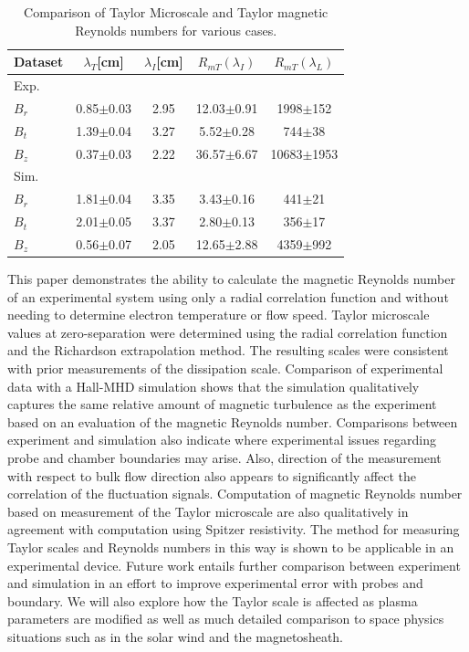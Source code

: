 \documentclass[aps,prl,amsmath,amssymb,reprint,superscriptaddress]{revtex4-1} %
\begin{document}
\begin{table} [htbp]
\caption{\label{tab:Rms1}Comparison of Taylor Microscale and Taylor magnetic Reynolds numbers for various cases.}
\begin{tabular}{lcccc}
\toprule
Dataset								& $\lambda_{T}$[cm]	&$\lambda_{I}$[cm]	&$R_{mT}(\lambda_{I})$&$R_{mT}(\lambda_L)$\\
\hline		  					
Exp.\\
\hline
$B_{r}$ 							& 0.85$\pm$0.03 		&	2.95							& 12.03$\pm$0.91 			& 1998$\pm$152\\
$B_{t}$			 					& 1.39$\pm$0.04 		&	3.27							& 5.52$\pm$0.28 			& 744$\pm$38\\
$B_{z}$ 							& 0.37$\pm$0.03 		&	2.22							& 36.57$\pm$6.67			& 10683$\pm$1953\\
\hline
Sim.\\
\hline
$B_{r}$			 					& 1.81$\pm$0.04 		&	3.35							& 3.43$\pm$0.16 			& 441$\pm$21\\
$B_{t}$ 							& 2.01$\pm$0.05 		&	3.37							& 2.80$\pm$0.13 			& 356$\pm$17\\
$B_{z}$ 							& 0.56$\pm$0.07 		&	2.05							& 12.65$\pm$2.88 			& 4359$\pm$992\\
\end{tabular}
\end{table}

This paper demonstrates the ability to calculate the magnetic Reynolds number of an experimental system using only a radial correlation function and without needing to determine electron temperature or flow speed. Taylor microscale values at zero-separation were determined using the radial correlation function and the Richardson extrapolation method. The resulting scales were consistent with prior measurements of the dissipation scale. Comparison of experimental data with a Hall-MHD simulation shows that the simulation qualitatively captures the same relative amount of magnetic turbulence as the experiment based on an evaluation of the magnetic Reynolds number. Comparisons between experiment and simulation also indicate where experimental issues regarding probe and chamber boundaries may arise. Also, direction of the measurement with respect to bulk flow direction also appears to significantly affect the correlation of the fluctuation signals. Computation of magnetic Reynolds number based on measurement of the Taylor microscale are also qualitatively in agreement with computation using Spitzer resistivity. The method for measuring Taylor scales and Reynolds numbers in this way is shown to be applicable in an experimental device. Future work entails further comparison between experiment and simulation in an effort to improve experimental error with probes and boundary. We will also explore how the Taylor scale is affected as plasma parameters are modified as well as much detailed comparison to space physics situations such as in the solar wind and the magnetosheath.
\end{document}
